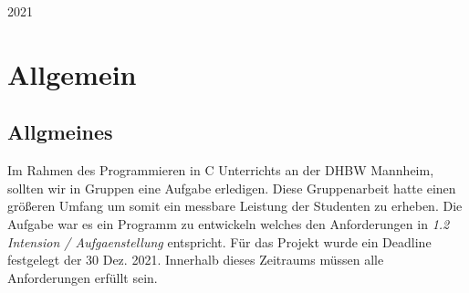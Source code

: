 \documentclass[a4paper, 11pt, oneside]{book} %
\begin{document}
\begin{titlepage}
	\vspace{0.3\baselineskip} 
	
	2021 

\end{titlepage}


\tableofcontents
\newpage

\chapter{Allgemein}

\section{Allgmeines}
Im Rahmen des Programmieren in C Unterrichts an der DHBW Mannheim, sollten wir in Gruppen eine Aufgabe erledigen. Diese Gruppenarbeit hatte einen größeren Umfang um somit ein messbare Leistung der Studenten zu erheben. Die Aufgabe war es ein Programm zu entwickeln welches den Anforderungen in \textit{1.2 Intension / Aufgaenstellung} entspricht. \newline Für das Projekt wurde ein Deadline festgelegt der 30 Dez. 2021. Innerhalb dieses Zeitraums müssen alle Anforderungen erfüllt sein.
\end{document}
